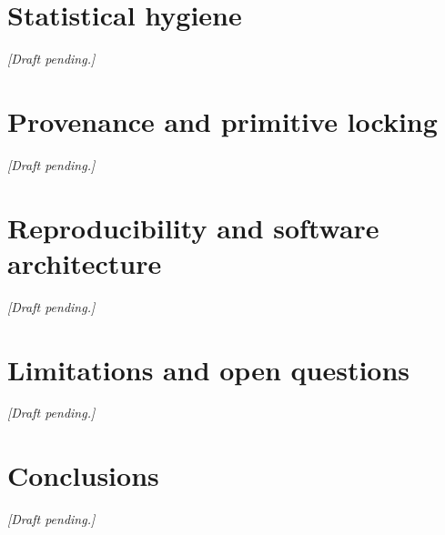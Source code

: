 \documentclass[12pt,a4paper]{article}
\begin{document}



% 






% 
% 




% 



\section{Statistical hygiene}\label{sec:statistics}\textit{[Draft pending.]}

\section{Provenance and primitive locking}\label{sec:provenance}\textit{[Draft pending.]}

\section{Reproducibility and software architecture}\label{sec:reproducibility}\textit{[Draft pending.]}

\section{Limitations and open questions}\label{sec:limitations}\textit{[Draft pending.]}

\section{Conclusions}\label{sec:conclusions}\textit{[Draft pending.]}



\end{document}
